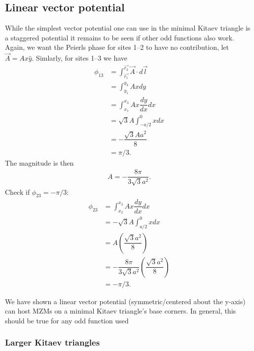 \subsection{Linear vector potential}

While the simplest vector potential one can use in the minimal Kitaev triangle is a staggered potential it remains to be seen if other odd functions also work.
Again, we want the Peierls phase for sites 1--2 to have no contribution, let $\vec{A} = Ax\hat{y}$.
Simlarly, for sites 1--3 we have
\begin{align}
  \phi_{13} &= \int_{\vec{r_1}}^{\vec{r_3}} \vec{A} \cdot d\vec{l} \nonumber \\
  &= \int_{y_1}^{y_3} Ax dy \nonumber \\
  &= \int_{x_1}^{x_3} Ax \dfrac{dy}{dx} dx \nonumber \\
  &= \sqrt{3} A \int_{-a/2}^{0} x dx \nonumber \\
  &= -\dfrac{\sqrt{3} A a^2}{8}  \nonumber \\
  &= \pi/3. \nonumber
\end{align}
The magnitude is then
\begin{align}
  A = -\dfrac{8 \pi}{3 \sqrt{3} a^2}.
\end{align}
Check if $\phi_{23} = -\pi/3$:
\begin{align}
  \phi_{23} &= \int_{x_2}^{x_3} Ax \dfrac{dy}{dx} dx \nonumber \\
  &= -\sqrt{3} A \int^{0}_{a/2} x dx \nonumber \\
  &= A \left(\dfrac{\sqrt{3} a^2}{8}\right)  \nonumber \\
  &= -\dfrac{8 \pi}{3 \sqrt{3} a^2} \left(\dfrac{\sqrt{3} a^2}{8}\right)  \nonumber \\
  &= -\pi/3 \nonumber.
\end{align}

We have shown a linear vector potential (symmetric/centered about the y-axis) can host MZMs on a minimal Kitaev triangle's base corners.
In general, this should be true for any odd function used
\subsubsection{Larger Kitaev triangles}

